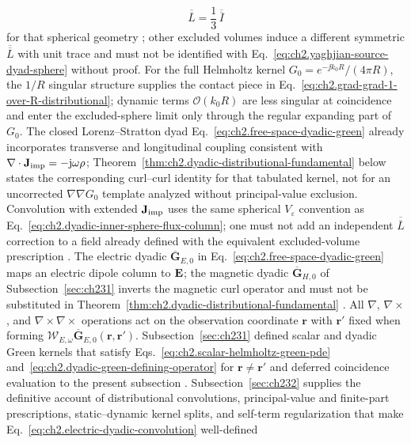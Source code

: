 \begin{equation}
\label{eq:ch2.yaghjian-source-dyad-sphere}
\overline{\overline{L}}=\frac13\,\overline{\overline{I}}
\end{equation}
for that spherical geometry \cite{yaghjian1978}; other excluded volumes induce a different symmetric $\overline{\overline{L}}$ with unit trace and must not be identified with Eq.~\eqref{eq:ch2.yaghjian-source-dyad-sphere} without proof.
For the full Helmholtz kernel $G_0=e^{-\jj k_0 R}/(4\pi R)$, the $1/R$ singular structure supplies the contact piece in Eq.~\eqref{eq:ch2.grad-grad-1-over-R-distributional};
dynamic terms $\mathcal{O}(k_0 R)$ are less singular at coincidence and enter the excluded-sphere limit only through the regular expanding part of $G_0$.
The closed Lorenz--Stratton dyad Eq.~\eqref{eq:ch2.free-space-dyadic-green} already incorporates transverse and longitudinal coupling consistent with $\nabla\cdot\mathbf{J}_{\mathrm{imp}}=-\mathrm{j}\omega\rho$;
Theorem~\ref{thm:ch2.dyadic-distributional-fundamental} below states the corresponding curl--curl identity for that tabulated kernel, not for an uncorrected $\nabla\nabla G_0$ template analyzed without principal-value exclusion.
Convolution with extended $\mathbf{J}_{\mathrm{imp}}$ uses the same spherical $V_\varepsilon$ convention as Eq.~\eqref{eq:ch2.dyadic-inner-sphere-flux-column}; one must not add an independent $\overline{\overline{L}}$ correction to a field already defined with the equivalent excluded-volume prescription \cite{yaghjian1978,tai1994}.
The electric dyadic $\overline{\mathbf{G}}_{E,0}$ in Eq.~\eqref{eq:ch2.free-space-dyadic-green} maps an electric dipole
column to $\mathbf{E}$; the magnetic dyadic $\overline{\mathbf{G}}_{H,0}$ of Subsection~\ref{sec:ch231} inverts the magnetic curl
operator and must not be substituted in Theorem~\ref{thm:ch2.dyadic-distributional-fundamental} \cite{tai1994}. All
$\nabla$, $\nabla\times$, and $\nabla\times\nabla\times$ operations act on the observation coordinate $\mathbf{r}$ with
$\mathbf{r}'$ fixed when forming $\mathcal{W}_{E,\omega}\overline{\mathbf{G}}_{E,0}(\mathbf{r},\mathbf{r}')$.
Subsection~\ref{sec:ch231} defined scalar and dyadic Green kernels that satisfy
Eqs.~\eqref{eq:ch2.scalar-helmholtz-green-pde} and~\eqref{eq:ch2.dyadic-green-defining-operator}
for \(\mathbf{r}\neq\mathbf{r}'\) and deferred coincidence evaluation to the present
subsection \cite{stratton1941}. Subsection~\ref{sec:ch232}
supplies the definitive account of distributional convolutions, principal-value
and finite-part prescriptions, static--dynamic kernel splits, and self-term
regularization that make Eq.~\eqref{eq:ch2.electric-dyadic-convolution} well-defined
